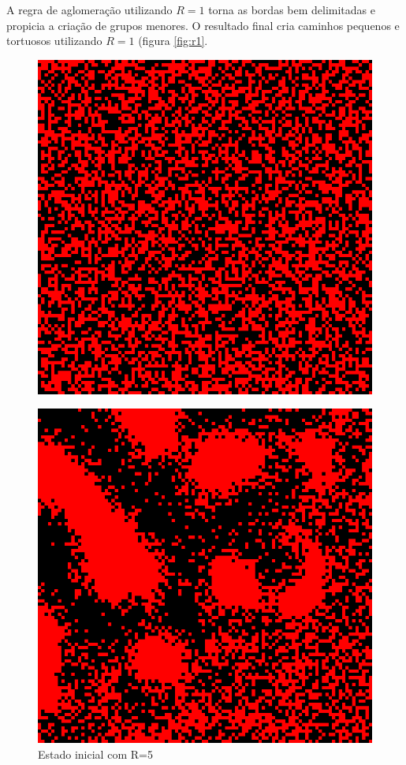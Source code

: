 \documentclass[conference]{IEEEtran}
\begin{document}
A regra de aglomeração utilizando $R=1$ torna as bordas bem delimitadas e propicia a criação de grupos menores. O resultado final cria caminhos pequenos e tortuosos utilizando $R=1$ (figura \ref{fig:r1}.

\begin{figure}[H]
  \begin{minipage}[b]{0.5\linewidth}
    \label{fig:r5} 
    \centering
    \includegraphics[width=.8\linewidth]{resultados/5-0.png} 
    \caption{Estado inicial com R=5} 
    \vspace{4ex}
  \end{minipage}%
  \begin{minipage}[b]{0.5\linewidth}
    \centering
    \includegraphics[width=.8\linewidth]{resultados/5-1.png} 

\end{minipage}
\end{figure}
\end{document}
